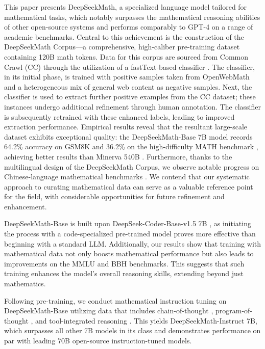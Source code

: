 This paper presents DeepSeekMath, a specialized language model tailored for mathematical tasks, which notably surpasses the mathematical reasoning abilities of other open-source systems and performs comparably to GPT-4 on a range of academic benchmarks. Central to this achievement is the construction of the DeepSeekMath Corpus—a comprehensive, high-caliber pre-training dataset containing 120B math tokens. Data for this corpus are sourced from Common Crawl (CC) through the utilization of a fastText-based classifier \citep{joulin2016fasttext}. The classifier, in its initial phase, is trained with positive samples taken from OpenWebMath \citep{openwebmath} and a heterogeneous mix of general web content as negative samples. Next, the classifier is used to extract further positive examples from the CC dataset; these instances undergo additional refinement through human annotation. The classifier is subsequently retrained with these enhanced labels, leading to improved extraction performance. Empirical results reveal that the resultant large-scale dataset exhibits exceptional quality: the DeepSeekMath-Base 7B model records 64.2\% accuracy on GSM8K \citep{gsm8k} and 36.2\% on the high-difficulty MATH benchmark \citep{MATH}, achieving better results than Minerva 540B \citep{minerva}. Furthermore, thanks to the multilingual design of the DeepSeekMath Corpus, we observe notable progress on Chinese-language mathematical benchmarks \citep{wei2023cmath,agieval}. We contend that our systematic approach to curating mathematical data can serve as a valuable reference point for the field, with considerable opportunities for future refinement and enhancement.

DeepSeekMath-Base is built upon DeepSeek-Coder-Base-v1.5 7B \citep{deepseek-coder}, as initiating the process with a code-specialized pre-trained model proves more effective than beginning with a standard LLM. Additionally, our results show that training with mathematical data not only boosts mathematical performance but also leads to improvements on the MMLU \citep{mmlu} and BBH \citep{bbh} benchmarks. This suggests that such training enhances the model's overall reasoning skills, extending beyond just mathematics.

Following pre-training, we conduct mathematical instruction tuning on DeepSeekMath-Base utilizing data that includes chain-of-thought \citep{cot}, program-of-thought \citep{pot,pal}, and tool-integrated reasoning \citep{tora}. This yields DeepSeekMath-Instruct 7B, which surpasses all other 7B models in its class and demonstrates performance on par with leading 70B open-source instruction-tuned models.

